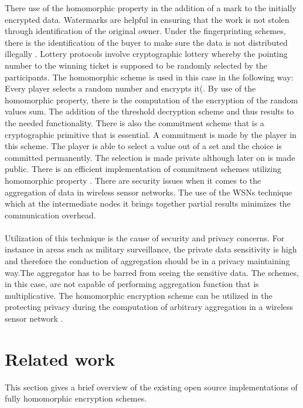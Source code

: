 There use of the homomorphic property in the addition of a mark to the initially encrypted data. Watermarks are helpful in ensuring that the work is not stolen through identification of the original owner. Under the fingerprinting schemes, there is the identification of the buyer to make sure the data is not distributed illegally \cite{sen2013homomorphic}.
Lottery protocols involve cryptographic lottery whereby the pointing number to the winning ticket is supposed to be randomly selected by the participants. The homomorphic scheme is used in this case in the following way: Every player selects a random number and encrypts it(\cite{sen2013homomorphic}. By use of the homomorphic property, there is the computation of the encryption of the random values sum. The addition of the threshold decryption scheme and thus results to the needed functionality.
\newpage
There is also the commitment scheme that is a cryptographic primitive that is essential. A commitment is made by the player in this scheme. The player is able to select a value out of a set and the choice is committed permanently. The selection is made private although later on is made public. There is an efficient implementation of commitment schemes utilizing homomorphic property \cite{sen2013homomorphic}.
There are security issues when it comes to the aggregation of data in wireless sensor networks. The use of the WSNs technique which at the intermediate nodes it brings together partial results minimizes the communication overhead. \\\\
Utilization of this technique is the cause of security and privacy concerns. For instance in areas such as military surveillance, the private data sensitivity is high and therefore the conduction of aggregation should be in a privacy maintaining way.The aggregator has to be barred from seeing the sensitive data. The schemes, in this case, are not capable of performing aggregation function that is multiplicative. The homomorphic encryption scheme can be utilized in the protecting privacy during the computation of arbitrary aggregation in a wireless sensor network \cite{sen2013homomorphic}.

\section{Related work}
This section gives a brief overview of the existing open source implementations of fully homomorphic encryption schemes.

